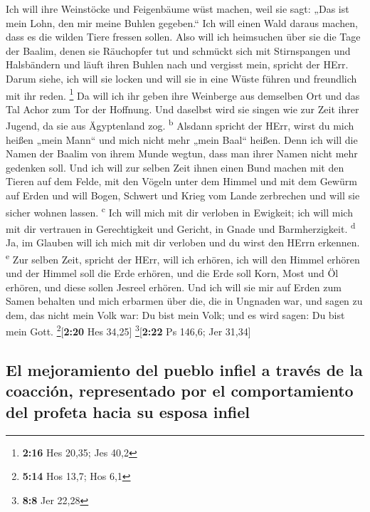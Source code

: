  Ich will ihre Weinstöcke und Feigenbäume wüst machen,
weil sie sagt: „Das ist mein Lohn, den mir meine Buhlen gegeben.`` Ich
will einen Wald daraus machen, dass es die wilden Tiere fressen sollen.
 Also will ich heimsuchen über sie die Tage der Baalim,
denen sie Räuchopfer tut und schmückt sich mit Stirnspangen und
Halsbändern und läuft ihren Buhlen nach und vergisst mein, spricht der
HErr.  Darum siehe, ich will sie locken und will sie in
eine Wüste führen und freundlich mit ihr reden. \footnote{\textbf{2:16}
  Hes 20,35; Jes 40,2}  Da will ich ihr geben ihre
Weinberge aus demselben Ort und das Tal Achor zum Tor der Hoffnung. Und
daselbst wird sie singen wie zur Zeit ihrer Jugend, da sie aus
Ägyptenland zog. \textsuperscript{b}  Alsdann spricht der
HErr, wirst du mich heißen „mein Mann`` und mich nicht mehr „mein Baal``
heißen.  Denn ich will die Namen der Baalim von ihrem
Munde wegtun, dass man ihrer Namen nicht mehr gedenken soll.
 Und ich will zur selben Zeit ihnen einen Bund machen mit
den Tieren auf dem Felde, mit den Vögeln unter dem Himmel und mit dem
Gewürm auf Erden und will Bogen, Schwert und Krieg vom Lande zerbrechen
und will sie sicher wohnen lassen. \textsuperscript{c} 
Ich will mich mit dir verloben in Ewigkeit; ich will mich mit dir
vertrauen in Gerechtigkeit und Gericht, in Gnade und Barmherzigkeit.
\textsuperscript{d}  Ja, im Glauben will ich mich mit dir
verloben und du wirst den HErrn erkennen. \textsuperscript{e}
 Zur selben Zeit, spricht der HErr, will ich erhören, ich
will den Himmel erhören und der Himmel soll die Erde erhören,
 und die Erde soll Korn, Most und Öl erhören, und diese
sollen Jesreel erhören.  Und ich will sie mir auf Erden
zum Samen behalten und mich erbarmen über die, die in Ungnaden war, und
sagen zu dem, das nicht mein Volk war: Du bist mein Volk; und es wird
sagen: Du bist mein Gott. \footnote{\textbf{5:14} Hos 13,7; Hos 6,1}{[}\textbf{2:20}
Hes 34,25{]} \footnote{\textbf{8:8} Jer 22,28}{[}\textbf{2:22} Ps 146,6;
Jer 31,34{]}

\hypertarget{el-mejoramiento-del-pueblo-infiel-a-travuxe9s-de-la-coacciuxf3n-representado-por-el-comportamiento-del-profeta-hacia-su-esposa-infiel}{%
\subsection{El mejoramiento del pueblo infiel a través de la coacción,
representado por el comportamiento del profeta hacia su esposa
infiel}\label{el-mejoramiento-del-pueblo-infiel-a-travuxe9s-de-la-coacciuxf3n-representado-por-el-comportamiento-del-profeta-hacia-su-esposa-infiel}}

